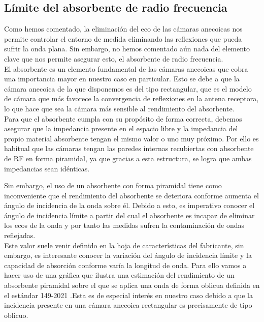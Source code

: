 \subsection{Límite del absorbente de radio frecuencia }

Como hemos comentado, la eliminación del eco de las cámaras anecoicas nos permite controlar el entorno de medida eliminando las reflexiones que pueda sufrir la onda plana. Sin embargo, no hemos comentado aún nada del elemento clave que nos permite asegurar esto, el absorbente de radio frecuencia. \\

El absorbente es un elemento fundamental de las cámaras anecoicas que cobra una importancia mayor en nuestro caso en particular. Esto se debe a que la cámara anecoica de la que disponemos es del tipo rectangular, que es el modelo de cámara que más favorece la convergencia de reflexiones en la antena receptora, lo que hace que sea la cámara más sensible al rendimiento del absorbente.
\\

Para que el absorbente cumpla con su propósito de forma correcta, debemos asegurar que la impedancia presente en el espacio libre y la impedancia del propio material absorbente tengan el mismo valor o uno muy próximo. Por ello es habitual que las cámaras tengan las paredes internas recubiertas con absorbente de RF en forma piramidal, ya que gracias a esta estructura, se logra que ambas impedancias sean idénticas. 

Sin embargo, el uso de un absorbente con forma piramidal tiene como inconveniente que el rendimiento del absorbente se deteriora conforme aumenta el ángulo de incidencia de la onda sobre él. Debido a esto, es imperativo conocer el ángulo de incidencia límite a partir del cual el absorbente es incapaz de eliminar los ecos de la onda y por tanto las medidas sufren la contaminación de ondas reflejadas.\\

Este valor suele venir definido en la hoja de características del fabricante, sin embargo, es interesante conocer la variación del ángulo de incidencia límite y la capacidad de absorción conforme varía la longitud de onda. Para ello vamos a hacer uso de una gráfica que ilustra una estimación del rendimiento de un absorbente piramidal sobre el que se aplica una onda de forma oblicua definida en el estándar 149-2021 \autocite{IEEEstd}.Esta es de especial interés en nuestro caso debido a que la incidencia presente en una cámara anecoica rectangular es precisamente de tipo oblicuo. 

